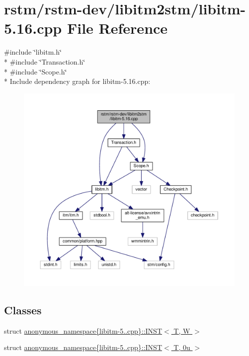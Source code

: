 \hypertarget{libitm-5_816_8cpp}{\section{rstm/rstm-\/dev/libitm2stm/libitm-\/5.16.cpp File Reference}
\label{libitm-5_816_8cpp}
}
{\ttfamily \#include \char`\"{}libitm.\-h\char`\"{}}\\*
{\ttfamily \#include \char`\"{}Transaction.\-h\char`\"{}}\\*
{\ttfamily \#include \char`\"{}Scope.\-h\char`\"{}}\\*
Include dependency graph for libitm-\/5.16.cpp\-:
\nopagebreak
\begin{figure}[H]
\begin{center}
\leavevmode
\includegraphics[width=350pt]{libitm-5_816_8cpp__incl}
\end{center}
\end{figure}
\subsection*{Classes}
\begin{DoxyCompactItemize}
\item 
struct \hyperlink{structanonymous__namespace_02libitm-5_816_8cpp_03_1_1INST}{anonymous\-\_\-namespace\{libitm-\/5..\-cpp\}\-::\-I\-N\-S\-T$<$ T, W $>$}
\item 
struct \hyperlink{structanonymous__namespace_02libitm-5_816_8cpp_03_1_1INST_3_01T_00_010u_01_4}{anonymous\-\_\-namespace\{libitm-\/5..\-cpp\}\-::\-I\-N\-S\-T$<$ T, 0u $>$}
\end{DoxyCompactItemize}
